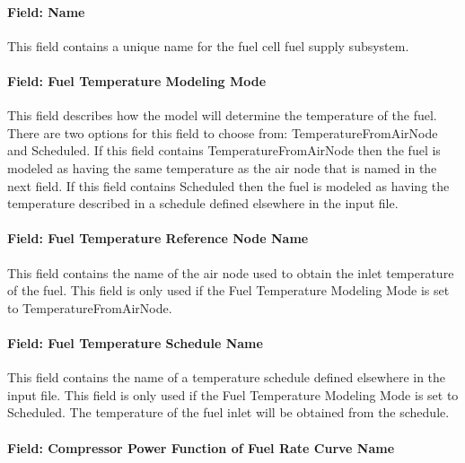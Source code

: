 \paragraph{Field: Name}\label{field-name-22}

This field contains a unique name for the fuel cell fuel supply subsystem.

\paragraph{Field: Fuel Temperature Modeling Mode}\label{field-fuel-temperature-modeling-mode}

This field describes how the model will determine the temperature of the fuel. There are two options for this field to choose from: TemperatureFromAirNode and Scheduled. If this field contains TemperatureFromAirNode then the fuel is modeled as having the same temperature as the air node that is named in the next field. If this field contains Scheduled then the fuel is modeled as having the temperature described in a schedule defined elsewhere in the input file.

\paragraph{Field: Fuel Temperature Reference Node Name}\label{field-fuel-temperature-reference-node-name}

This field contains the name of the air node used to obtain the inlet temperature of the fuel. This field is only used if the Fuel Temperature Modeling Mode is set to TemperatureFromAirNode.

\paragraph{Field: Fuel Temperature Schedule Name}\label{field-fuel-temperature-schedule-name}

This field contains the name of a temperature schedule defined elsewhere in the input file. This field is only used if the Fuel Temperature Modeling Mode is set to Scheduled. The temperature of the fuel inlet will be obtained from the schedule.

\paragraph{Field: Compressor Power Function of Fuel Rate Curve Name}\label{field-compressor-power-function-of-fuel-rate-curve-name}

